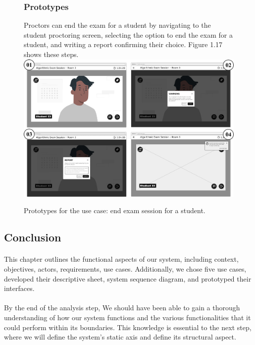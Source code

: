 \documentclass[]{uc2pfecaneva}
\begin{document}
    \begin{figure}[h]
        \subsubsection{Prototypes}
        \raggedright Proctors can end the exam for a student by navigating to the student proctoring screen, selecting the option to end the exam for a student, and writing a report confirming their choice. Figure 1.17 shows these steps.
        \linebreak
        \includegraphics[width=\textwidth]{images/prototypes_end_exam_session}
        \caption{Prototypes for the use case: end exam session for a student.}
    \end{figure}
    \clearpage
    \raggedright\subsection{Conclusion}
    \justifying\paragraph{}
    This chapter outlines the functional aspects of our system, including context, objectives, actors, requirements, use cases. Additionally, we chose five use cases, developed their descriptive sheet, system sequence diagram, and prototyped their interfaces.
    \justifying\paragraph{}
    By the end of the analysis step, We should have been able to gain a thorough understanding of how our system functions and the various functionalities that it could perform within its boundaries. This knowledge is essential to the next step, where we will define the system's static axis and define its structural aspect.
\end{document}

